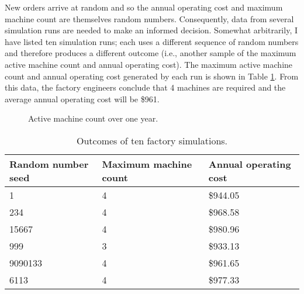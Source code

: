 New orders arrive at random and so the annual operating cost and maximum machine count are themselves random numbers. Consequently, data from several simulation runs are needed to make an informed decision. Somewhat arbitrarily, I have listed ten simulation runs; each uses a different sequence of random numbers and therefore produces a different outcome (i.e., another sample of the maximum active machine count and annual operating cost). The maximum active machine count and annual operating cost generated by each run is shown in Table \ref{tab:monte_carlo_outcome}. From this data, the factory engineers conclude that 4 machines are required and the average annual operating cost will be \$961.
\begin{figure}[ht]
\centering
{}
\caption{Active machine count over one year.}
\label{fig:active_machine_plot}
\end{figure}
\begin{table}[ht]
\centering
\begin{tabular}{|l|l|l|}
\hline
Random number seed & Maximum machine count & Annual operating cost \\ \hline
1 & 4 & \$944.05 \\ \hline
234 & 4 & \$968.58 \\ \hline
15667 & 4 & \$980.96 \\ \hline
999 & 3 & \$933.13 \\ \hline
9090133 & 4 & \$961.65 \\ \hline
6113 & 4 & \$977.33 \\ \hline
\end{tabular}
\caption{Outcomes of ten factory simulations.}
\label{tab:monte_carlo_outcome}
\end{table}


